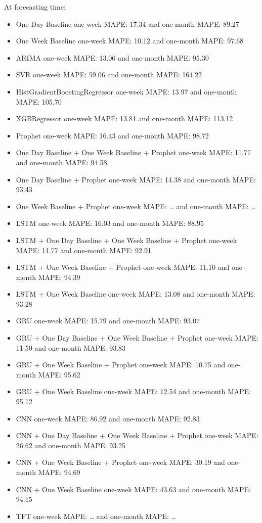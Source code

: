At forecasting time:
\begin{itemize}
  \item One Day Baseline one-week MAPE: 17.34 and one-month MAPE: 89.27
  \item One Week Baseline one-week MAPE: 10.12 and one-month MAPE: 97.68
  \item ARIMA one-week MAPE: 13.06 and one-month MAPE: 95.30
  \item SVR one-week MAPE: 59.06 and one-month MAPE: 164.22
  \item HistGradientBoostingRegressor one-week MAPE: 13.97 and one-month MAPE: 105.70
  \item XGBRegressor one-week MAPE: 13.81 and one-month MAPE: 113.12
  \item Prophet one-week MAPE: 16.43 and one-month MAPE: 98.72
  \item One Day Baseline + One Week Baseline + Prophet one-week MAPE: 11.77 and one-month MAPE: 94.58
  \item One Day Baseline + Prophet one-week MAPE: 14.38 and one-month MAPE: 93.43
  \item One Week Baseline + Prophet one-week MAPE: … and one-month MAPE: …
  \item LSTM one-week MAPE: 16.03 and one-month MAPE: 88.95
  \item LSTM + One Day Baseline + One Week Baseline + Prophet one-week MAPE: 11.77 and one-month MAPE: 92.91
  \item LSTM + One Week Baseline + Prophet one-week MAPE: 11.10 and one-month MAPE: 94.39
  \item LSTM + One Week Baseline one-week MAPE: 13.08 and one-month MAPE: 93.28
  \item GRU one-week MAPE: 15.79 and one-month MAPE: 93.07
  \item GRU + One Day Baseline + One Week Baseline + Prophet one-week MAPE: 11.50 and one-month MAPE: 93.83
  \item GRU + One Week Baseline + Prophet one-week MAPE: 10.75 and one-month MAPE: 95.62
  \item GRU + One Week Baseline one-week MAPE: 12.54 and one-month MAPE: 95.12
  \item CNN one-week MAPE: 86.92 and one-month MAPE: 92.83
  \item CNN + One Day Baseline + One Week Baseline + Prophet one-week MAPE: 26.62 and one-month MAPE: 93.25
  \item CNN + One Week Baseline + Prophet one-week MAPE: 30.19 and one-month MAPE: 94.69
  \item CNN + One Week Baseline one-week MAPE: 43.63 and one-month MAPE: 94.15
  \item TFT one-week MAPE: … and one-month MAPE: …
\end{itemize}

